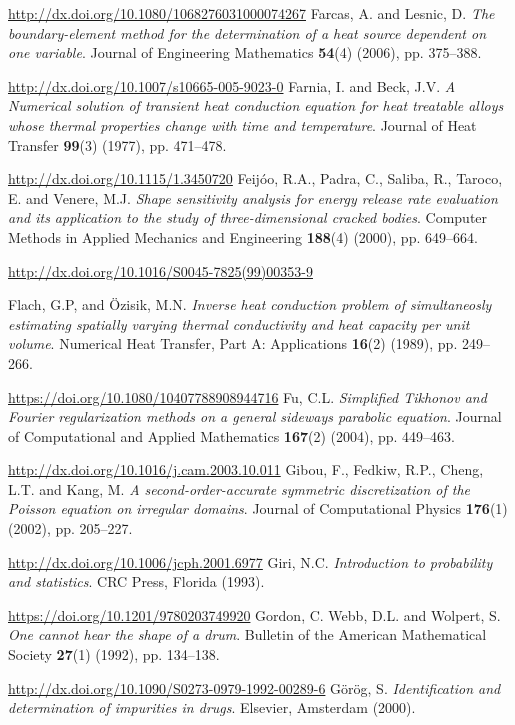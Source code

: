 \begin{thebibliography}{301}
\url{http://dx.doi.org/10.1080/1068276031000074267}
%
%
 Farcas, A. and Lesnic, D. {\it The boundary-element method for the determination of a heat source dependent on one variable}. Journal of Engineering Mathematics {\bf 54}(4) (2006), pp. 375--388.

\url{http://dx.doi.org/10.1007/s10665-005-9023-0}
%
%
 Farnia, I. and Beck, J.V. {\it A Numerical solution of transient heat conduction equation for heat treatable alloys whose thermal properties change with time and temperature}. Journal of Heat Transfer {\bf 99}(3) (1977), pp. 471--478.

\url{http://dx.doi.org/10.1115/1.3450720}
%
%
 Feij\'oo, R.A., Padra, C., Saliba, R., Taroco, E. and Venere, M.J. {\it Shape sensitivity analysis for energy release rate evaluation and its application to the study of three-dimensional cracked bodies}. Computer Methods in Applied Mechanics and Engineering {\bf 188}(4) (2000), pp. 649--664.

\url{http://dx.doi.org/10.1016/S0045-7825(99)00353-9}

%
 Flach, G.P, and \"Ozisik, M.N. {\it Inverse heat conduction problem of simultaneosly estimating spatially varying thermal conductivity and heat capacity per unit volume}. Numerical Heat Transfer, Part A: Applications {\bf 16}(2) (1989), pp. 249--266.

\url{https://doi.org/10.1080/10407788908944716}
%
%
 Fu, C.L. {\it Simplified Tikhonov and Fourier regularization methods on a general sideways parabolic equation}. Journal of Computational and Applied Mathematics {\bf 167}(2) (2004), pp. 449--463.

\url{http://dx.doi.org/10.1016/j.cam.2003.10.011}
%
%
 Gibou, F., Fedkiw, R.P., Cheng, L.T. and Kang, M. {\it A second-order-accurate symmetric discretization of the Poisson equation on irregular domains}. Journal of Computational Physics {\bf 176}(1) (2002), pp. 205--227.

\url{http://dx.doi.org/10.1006/jcph.2001.6977}
%
%
 Giri, N.C. {\it Introduction to probability and statistics}. CRC Press, Florida (1993). 

\url{https://doi.org/10.1201/9780203749920} 
%
%
 Gordon, C. Webb, D.L. and Wolpert, S. {\it One cannot hear the shape of a drum}. Bulletin of the American Mathematical Society {\bf 27}(1) (1992), pp. 134--138.

\url{http://dx.doi.org/10.1090/S0273-0979-1992-00289-6}
%
%
 G\"or\"og, S. {\it Identification and determination of impurities in drugs}. Elsevier, Amsterdam (2000). 


\end{thebibliography}
